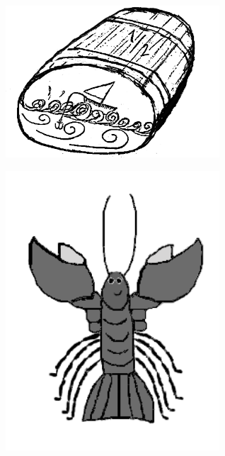 %



\sclearpage







\begin{intersong}
	\begin{center}
		\includegraphics[width=0.6\textwidth]{../bilder/fardigabilder/CamillasFardigaBilder/Halvankaren2.png} 
	\end{center}
\end{intersong}




\begin{intersong}
	\begin{center}
		\includegraphics[width=0.6\textwidth]{../bilder/fardigabilder/CamillasFardigaBilder/Krafta.png} 
	\end{center}
\end{intersong}
